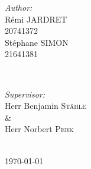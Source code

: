 \documentclass[a4paper,11pt,singlespacing]{article}
\begin{document}
\begin{titlepage}
	\begin{minipage}{0.4\textwidth}
		\begin{flushleft} \large
			\emph{Author:}\\
   			Rémi \textsc{JARDRET}\\
			20741372\\
			Stéphane \textsc{SIMON}\\
			21641381
		\end{flushleft}
	\end{minipage}
	~
	\begin{minipage}{0.4\textwidth}
		\begin{flushright} \large
			\emph{Supervisor:} \\
			Herr Benjamin \textsc{Stähle}\\ %
            \& \\
			Herr Norbert \textsc{Perk} %
		\end{flushright}
	\end{minipage}\\[5cm]
	
	
	
	{\large \today}\\[5cm] %
	

	
	\vfill %
	
\end{titlepage}


\tableofcontents
\pagebreak

\end{document}
